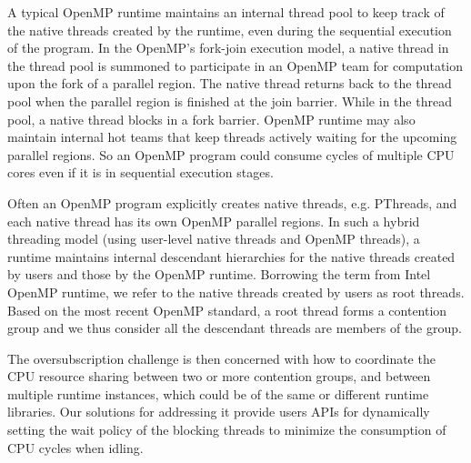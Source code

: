 
A typical OpenMP runtime maintains 
an internal thread pool to keep track of the native threads created by the runtime, 
even during the sequential execution of the program. 
In the OpenMP's fork-join execution model, a native thread in the thread pool 
is summoned to participate in an OpenMP team for computation upon the fork of a {\sf parallel} region. 
The native thread returns back to the thread pool when the {\sf parallel} 
region is finished at the join barrier. While in the 
thread pool, a native thread blocks in a fork barrier. 
OpenMP runtime may also
maintain internal hot teams that keep threads actively waiting for the upcoming {\sf parallel} regions. 
So an OpenMP program could consume cycles of multiple CPU cores even if it is in sequential execution stages.

Often an OpenMP program explicitly creates native threads, e.g. PThreads, and each native thread has
its own OpenMP {\sf parallel} regions. 
In such a hybrid threading model (using user-level native threads and OpenMP threads), 
a runtime maintains internal descendant hierarchies for the native threads created by users and
those by the OpenMP runtime. Borrowing the term from Intel OpenMP runtime, we refer to 
the native threads created by users as root threads. 
Based on the most recent OpenMP standard, a root thread forms a contention group and we thus 
consider all the descendant threads are members of the group. 


The oversubscription challenge is then concerned with how 
to coordinate the CPU resource sharing between two or more contention groups, and between multiple 
runtime instances, which could be of the same or different runtime libraries. 
Our solutions for addressing it provide users APIs for 
dynamically setting the wait policy of the blocking threads to minimize 
the consumption of CPU cycles when idling. 


